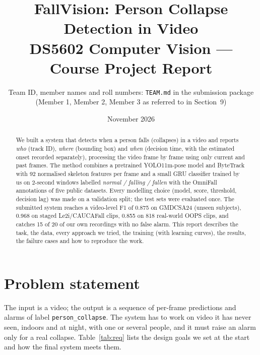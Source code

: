 \documentclass[11pt,a4paper]{article}
\title{\textbf{FallVision: Person Collapse Detection in Video}\\[4pt]
\large DS5602 Computer Vision --- Course Project Report}
\author{\small Team ID, member names and roll numbers: \texttt{TEAM.md} in the submission package\\
\small (Member 1, Member 2, Member 3 as referred to in Section~9)}
\date{November 2026}
\newcommand{\code}[1]{\texttt{\small #1}}
\begin{document}
\maketitle

\begin{abstract}
We built a system that detects when a person falls (collapses) in a video and reports \emph{who} (track ID),
\emph{where} (bounding box) and \emph{when} (decision time, with the estimated onset recorded separately),
processing the video frame by frame using only current and past frames. The method combines a pretrained
YOLO11m-pose model and ByteTrack with 92 normalised skeleton features per frame and a small GRU classifier
trained by us on 2-second windows labelled \emph{normal / falling / fallen} with the OmniFall annotations of
five public datasets. Every modelling choice (model, score, threshold, decision lag) was made on a validation
split; the test sets were evaluated once. The submitted system reaches a video-level F1 of 0.875 on GMDCSA24
(unseen subjects), 0.968 on staged Le2i/CAUCAFall clips, 0.855 on 818 real-world OOPS clips, and catches 15 of
20 of our own recordings with no false alarm. This report describes the task, the data, every approach we tried,
the training (with learning curves), the results, the failure cases and how to reproduce the work.
\end{abstract}

\section{Problem statement}
The input is a video; the output is a sequence of per-frame predictions and alarms of label
\code{person\_collapse}. The system has to work on video it has never seen, indoors and at night, with one
or several people, and it must raise an alarm only for a real collapse. Table~\ref{tab:req} lists the design
goals we set at the start and how the final system meets them.
\end{document}
